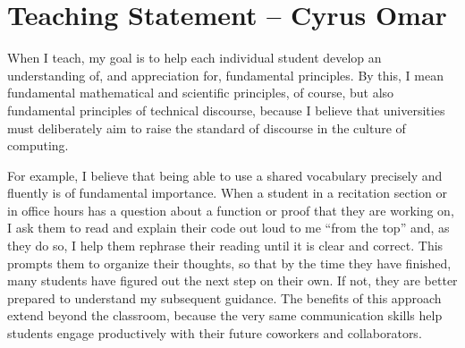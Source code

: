 \documentclass[9pt]{extarticle}
\begin{document}
\vspace{-8px}
\section*{Teaching Statement -- Cyrus Omar}
\vspace{-6px}


When I teach, my goal is to help each individual student develop an understanding of, and appreciation for, fundamental principles. By this, I mean fundamental mathematical and scientific principles, of course, but also fundamental principles of technical discourse, because I believe that universities must deliberately aim to raise the standard of discourse in the culture of computing.

For example, I believe that being able to use a {shared vocabulary} precisely and fluently is of fundamental importance. 
When a student in a recitation section or in office hours has a question about a function or proof that they are working on, I ask them to read and explain their code out loud to me ``from the top'' and, as they do so, I help them rephrase their reading until it is clear and correct. This prompts them to organize their thoughts, so that by the time they have finished, many students have figured out the next step on their own.
%
%
If not, they are better prepared to understand my subsequent guidance. %
The benefits of this approach extend beyond the classroom, because the very same communication skills help students engage productively with their future coworkers and collaborators. 
\end{document}
